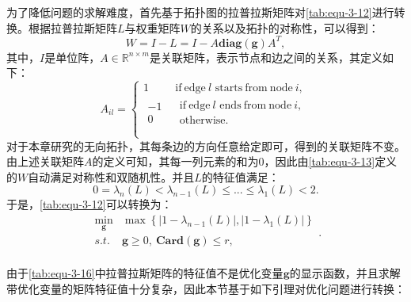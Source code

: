 为了降低问题的求解难度，首先基于拓扑图的拉普拉斯矩阵对\autoref{tab:equ-3-12}进行转换。根据拉普拉斯矩阵$L$与权重矩阵$W$的关系以及拓扑的对称性，可以得到：
\begin{equation}
    \label{tab:equ-3-13}
    W=I-L=I-A\mathbf{diag}\left( \mathbf{g} \right) A^T,
\end{equation}
其中，$I$是单位阵，$A\in \mathbb{R} ^{n\times m}$是关联矩阵，表示节点和边之间的关系，其定义如下：
\begin{equation}
    \label{tab:equ-3-14}
    A_{il}=\left\{ \begin{matrix}
        1&		\mathrm{if}\ \mathrm{edge}\ l\,\,\mathrm{starts}\ \mathrm{from}\ \mathrm{node}\ i,\\
        \begin{array}{c}
        -1\\
        0\\
    \end{array}&		\begin{array}{c}
        \mathrm{if}\ \mathrm{edge}\ l\,\,\mathrm{ends}\ \mathrm{from}\ \mathrm{node}\ i,\\
        \mathrm{otherwise}.\\
    \end{array}\\
    \end{matrix} \right.
\end{equation}
对于本章研究的无向拓扑，其每条边的方向任意给定即可，得到的关联矩阵不变。由上述关联矩阵$A$的定义可知，其每一列元素的和为0，因此由\autoref{tab:equ-3-13}定义的$W$自动满足对称性和双随机性。并且$L$的特征值满足：
\begin{equation}
    \label{tab:equ-3-15}
    0=\lambda _n\left( L \right) <\lambda _{n-1}\left( L \right) \leqslant ...\leqslant \lambda _1\left( L \right) <2.
\end{equation}
于是，\autoref{tab:equ-3-12}可以转换为：
\begin{equation}
    \label{tab:equ-3-16}
    \begin{matrix}
        \underset{\mathbf{g}}{\min}&		\max \left\{ \left| 1-\lambda _{n-1}\left( L \right) \right|,\left| 1-\lambda _1\left( L \right) \right| \right\}\\
        s.t.&		\mathbf{g}\ge 0,\ \mathbf{Card}\left( \mathbf{g} \right) \le r,\\
    \end{matrix}.
\end{equation}

由于\autoref{tab:equ-3-16}中拉普拉斯矩阵的特征值不是优化变量$\mathbf{g}$的显示函数，并且求解带优化变量的矩阵特征值十分复杂，因此本节基于如下引理对优化问题进行转换：


